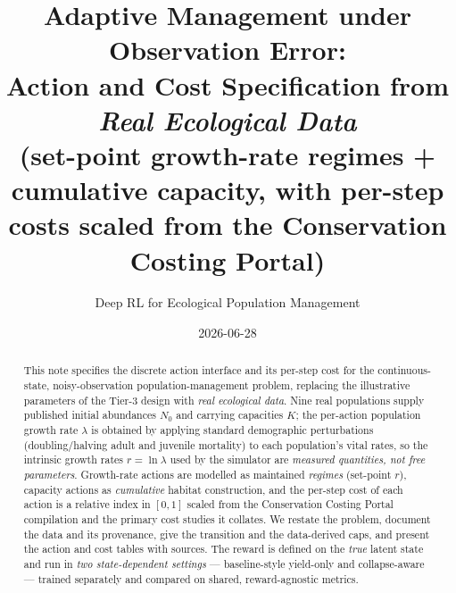 \documentclass[11pt]{article}
\title{Adaptive Management under Observation Error:\\
Action and Cost Specification from \emph{Real Ecological Data}\\
\large (set-point growth-rate regimes + cumulative capacity, with per-step costs
scaled from the Conservation Costing Portal)}
\author{Deep RL for Ecological Population Management}
\date{2026-06-28}
\begin{document}
\maketitle

\begin{abstract}
This note specifies the discrete action interface and its per-step cost for the
continuous-state, noisy-observation population-management problem, replacing the
illustrative parameters of the Tier-3 design with \emph{real ecological data}.
Nine real populations supply published initial abundances $N_0$ and carrying
capacities $K$; the per-action population growth rate $\lambda$ is obtained by
applying standard demographic perturbations (doubling/halving adult and juvenile
mortality) to each population's vital rates, so the intrinsic growth rates
$r=\ln\lambda$ used by the simulator are \emph{measured quantities, not free
parameters}. Growth-rate actions are modelled as maintained \emph{regimes}
(set-point $r$), capacity actions as \emph{cumulative} habitat construction, and
the per-step cost of each action is a relative index in $[0,1]$ scaled from the
Conservation Costing Portal compilation \cite{white2022,iaconaportal} and the
primary cost studies it collates. We restate the problem, document the data and
its provenance, give the transition and the data-derived caps, and present the
action and cost tables with sources. The reward is defined on the \emph{true}
latent state and run in \emph{two state-dependent settings} --- baseline-style
yield-only and collapse-aware --- trained separately and compared on shared,
reward-agnostic metrics.
\end{abstract}
\end{document}
